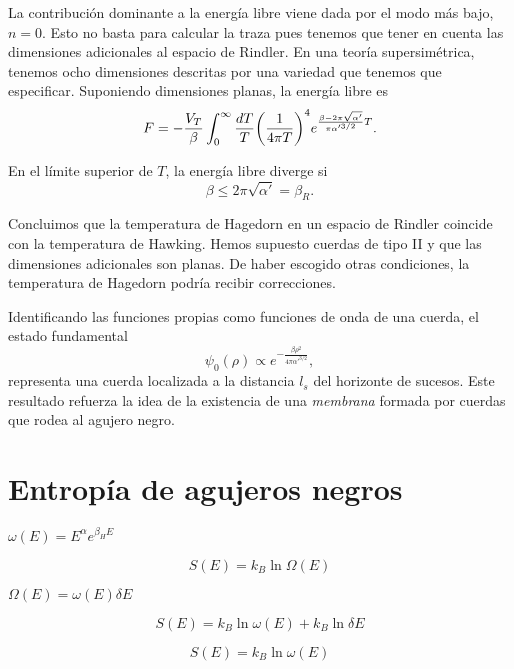 La contribución dominante a la energía libre viene dada por el modo más bajo, $n=0$.
Esto no basta para calcular la traza pues tenemos que tener en cuenta las dimensiones adicionales al espacio de Rindler. 
En una teoría supersimétrica, tenemos ocho dimensiones descritas por una variedad que tenemos que especificar.
Suponiendo dimensiones planas, la energía libre es
\begin{equation}
  F= -\frac{V_T}{\beta}\int_0^\infty \frac{dT}{T}\qty(\frac{1}{4\pi T})^4 e^{\frac{\beta-2\pi\sqrt{\alpha'}}{\pi\alpha'^{3/2}}T}.
\end{equation}

En el límite superior de $T$, la energía libre diverge si
\begin{equation}
  \beta \leq 2\pi\sqrt{\alpha'}=\beta_R.
\end{equation}

Concluimos que la temperatura de Hagedorn en un espacio de Rindler coincide con la temperatura
de Hawking.
Hemos supuesto cuerdas de tipo II y que las dimensiones adicionales son planas.
De haber escogido otras condiciones, la temperatura de Hagedorn podría recibir correcciones.

Identificando las funciones propias como funciones de onda de una cuerda, el estado fundamental
\begin{equation}
  \psi_0(\rho)\propto e^{-\frac{\beta \rho^2}{4\pi\alpha'^{3/2}} },
\end{equation}
representa una cuerda localizada a la distancia $l_s$ del horizonte de sucesos.
Este resultado refuerza la idea de la existencia de una \emph{membrana} formada por cuerdas
que rodea al agujero negro.


\section{Entropía de agujeros negros}

$\omega(E) = E^\alpha e^{\beta_H E}$

\begin{equation}
  S(E) = k_B\ln\Omega(E)
\end{equation}

$\Omega(E) = \omega(E)\delta E$

\begin{equation}
  S(E) = k_B \ln \omega(E) + k_B \ln \delta E
\end{equation}

\begin{equation}
  S(E) = k_B \ln \omega(E)
\end{equation}

